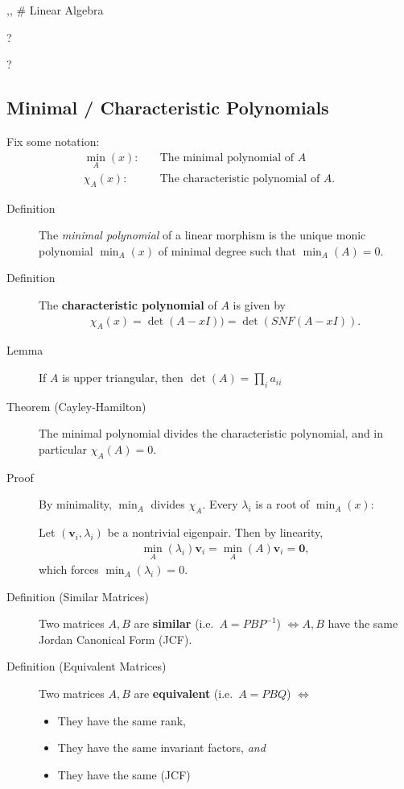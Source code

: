 {},{}, \# Linear Algebra

\begin{description}
\tightlist
\item[Definition (Invariant Factor)]
?
\item[Definition (Elementary Divisor)]
?
\end{description}

\hypertarget{minimal-characteristic-polynomials}{%
\subsection{Minimal / Characteristic
Polynomials}\label{minimal-characteristic-polynomials}}

Fix some notation:
\begin{align*} \min_A(x): \quad & \text{The minimal polynomial of } A \\ \chi_A(x): \quad & \text{The characteristic polynomial of } A .\end{align*}

\begin{description}
\item[Definition]
The \emph{minimal polynomial} of a linear morphism is the unique monic
polynomial \(\min_A(x)\) of minimal degree such that \(\min_A(A) = 0\).
\item[Definition]
The \textbf{characteristic polynomial} of \(A\) is given by
\begin{align*}
\chi_A(x) = \det(A - xI))= \det(SNF(A - xI))
.\end{align*}
\item[Lemma]
If \(A\) is upper triangular, then \(\det(A) = \prod_{i} a_{ii}\)
\item[Theorem (Cayley-Hamilton)]
The minimal polynomial divides the characteristic polynomial, and in
particular \(\chi_A(A) = 0\).
\item[Proof]
By minimality, \(\min_A\) divides \(\chi_A\). Every \(\lambda_i\) is a
root of \(\min_A(x)\):

Let \((\mathbf{v}_i, \lambda_i)\) be a nontrivial eigenpair. Then by
linearity,
\begin{align*}
\min_A(\lambda_i)\mathbf{v}_i = \min_A(A)\mathbf{v}_i = \mathbf{0}
,\end{align*}
which forces \(\min_A(\lambda_i) = 0\).
\item[Definition (Similar Matrices)]
Two matrices \(A,B\) are \textbf{similar} (i.e.~\(A = PBP^{-1}\))
\(\iff A,B\) have the same Jordan Canonical Form (JCF).
\item[Definition (Equivalent Matrices)]
Two matrices \(A, B\) are \textbf{equivalent} (i.e.~\(A = PBQ\))
\(\iff\)

\begin{itemize}
\item
  They have the same rank,
\item
  They have the same invariant factors, \emph{and}
\item
  They have the same (JCF)
\end{itemize}
\end{description}

